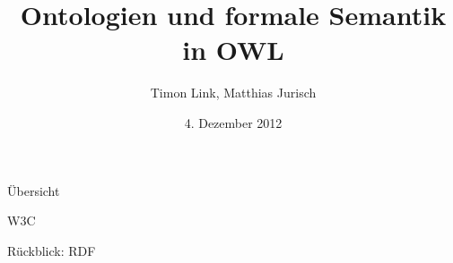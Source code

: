 \documentclass{beamer}
\title[OWL]{Ontologien und formale Semantik in OWL}
\author{Timon Link, Matthias Jurisch}
\date{4. Dezember 2012}
\begin{document}
\begin{frame}
\titlepage
\end{frame}

\begin{frame}{Übersicht}
\end{frame}

\begin{frame}{W3C}
\end{frame}

\begin{frame}{Rückblick: RDF}
\end{frame}

\end{document}
